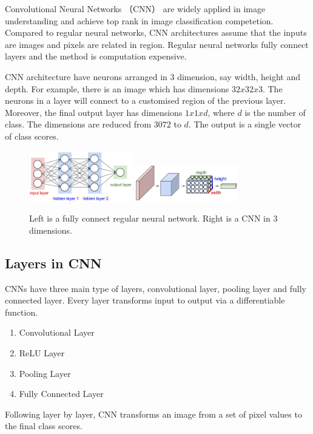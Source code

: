 Convolutional Neural Networks\citep{lecun1998gradient} （CNN） are widely applied in image understanding and achieve top rank in image classification competetion\citep{krizhevsky2012imagenet}. Compared to regular neural networks, CNN architectures assume that the inputs are images and pixels are related in region. Regular neural networks fully connect layers and the method is computation expensive.

CNN architecture have neurons arranged in 3 dimension, say width, height and depth. For example, there is an image which has dimensions $32x32x3$. The neurons in a layer will connect to a customised region of the previous layer. Moreover, the final output layer has dimensions $1x1xd$, where $d$ is the number of class. The dimensions are reduced from $3072$ to $d$. The output is a single vector of class scores.

\graphicspath{ {./Figures/} }
\begin{figure}[!htb]
\centering
\includegraphics[width=0.4\textwidth]{neural_net2.jpeg}
\includegraphics[width=0.4\textwidth]{cnn.jpeg}
\caption{\label{fig:perceptron}Left is a fully connect regular neural network. Right is a CNN in 3 dimensions.}
\end{figure}

\subsection{Layers in CNN}
CNNs have three main type of layers, convolutional layer, pooling layer and fully connected layer. Every layer transforms input to output via a differentiable function. 
\begin{enumerate}
  \item Convolutional Layer
  \item ReLU Layer
  \item Pooling Layer
  \item Fully Connected Layer
\end{enumerate}
Following layer by layer, CNN transforms an image from a set of pixel values to the final class scores.

